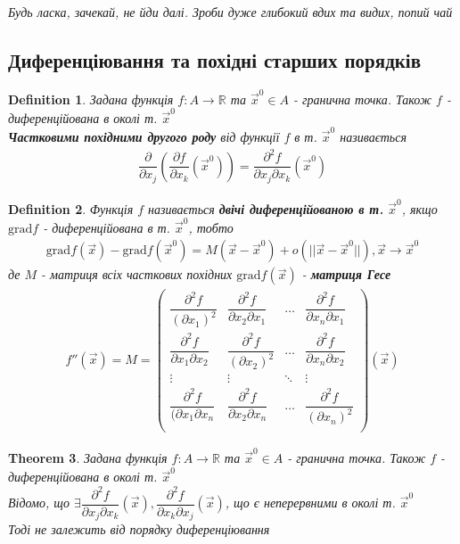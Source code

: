 \documentclass[a4paper, 14pt]{extarticle}
\theoremstyle{theoremdd}
\newtheorem{theorem}{Theorem}[subsection]
\theoremstyle{theoremdd}
\newtheorem{definition}[theorem]{Definition}
\theoremstyle{theoremdd}
\theoremstyle{theoremdd}
\theoremstyle{theoremdd}
\theoremstyle{theoremdd}
\theoremstyle{theoremdd}
\theoremstyle{theoremdd}
\begin{document}
\textit{Будь ласка, зачекай, не йди далі. Зроби дуже глибокий вдих та видих, попий чай}

\subsection{Диференціювання та похідні старших порядків}
\begin{definition}
Задана функція $f: A \to \mathbb{R}$ та $\vec{x}^0 \in A$ - гранична точка. Також $f$ - диференційована в околі т. $\vec{x}^0$\\
\textbf{Частковими похідними другого роду} від функції $f$ в т. $\vec{x}^0$ називається
\begin{align*}
\dfrac{\partial}{\partial x_j} \left( \dfrac{\partial f}{\partial x_k} (\vec{x}^0) \right) = \dfrac{\partial^2 f}{\partial x_j \partial x_k} (\vec{x}^0)
\end{align*}
\end{definition}

\begin{definition}
Функція $f$ називається \textbf{двічі диференційованою в т.} $\vec{x}^0$, якщо $\textrm{grad} f$ - диференційована в т. $\vec{x}^0$, тобто
\begin{align*}
\textrm{grad} f(\vec{x}) - \textrm{grad} f(\vec{x}^0) = M(\vec{x} - \vec{x}^0) + o(|| \vec{x}-\vec{x}^0||), \vec{x} \to \vec{x}^0
\end{align*}
де $M$ - матриця всіх часткових похідних $\textrm{grad} f(\vec{x})$ - \textbf{матриця Гесе}
\begin{align*}
f''(\vec{x}) = M = \begin{pmatrix}
\dfrac{\partial^2 f}{(\partial x_1)^2} & \dfrac{\partial^2 f}{\partial x_2 \partial x_1} & \dots & \dfrac{\partial^2 f}{\partial x_n \partial x_1} \\
\dfrac{\partial^2 f}{\partial x_1 \partial x_2} & \dfrac{\partial^2 f}{(\partial x_2)^2} & \dots & \dfrac{\partial^2 f}{\partial x_n \partial x_2} \\
\vdots & \vdots & \ddots & \vdots \\
\dfrac{\partial^2 f}{(\partial x_1 \partial x_n} & \dfrac{\partial^2 f}{\partial x_2 \partial x_n} & \dots & \dfrac{\partial^2 f}{(\partial x_n)^2} \\
\end{pmatrix}(\vec{x})
\end{align*}
\end{definition}

\begin{theorem}
Задана функція $f: A \to \mathbb{R}$ та $\vec{x}^0 \in A$ - гранична точка. Також $f$ - диференційована в околі т. $\vec{x}^0$\\
Відомо, що $\exists \dfrac{\partial^2 f}{\partial x_j \partial x_k} (\vec{x}), \dfrac{\partial^2 f}{\partial x_k \partial x_j} (\vec{x})$, що є неперервними в околі т. $\vec{x}^0$\\
Тоді не залежить від порядку диференціювання
\end{theorem}
\end{document}
